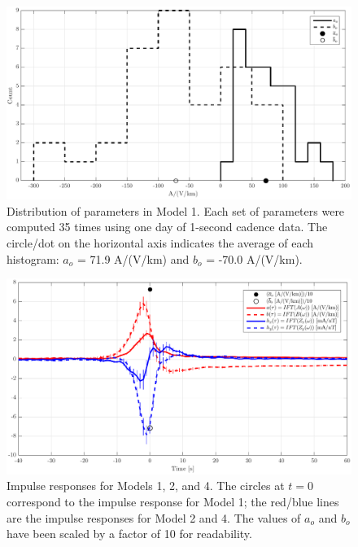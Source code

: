 \documentclass[draft,linenumbers]{agujournal2018}
\begin{document}
\begin{figure}[h]
\centering
\includegraphics[width=\textwidth]{figures/plot_model_summary_aobo_histograms-options-1.pdf}
\caption{Distribution of parameters in Model 1. Each set of parameters were computed 35 times using one day of 1-second cadence data. The circle/dot on the horizontal axis indicates the average of each histogram: $a_o$ = 71.9 A/(V/km) and $b_o$ = -70.0 A/(V/km).}
\label{histogram}
\end{figure}

\begin{figure}[h]
\centering
\includegraphics[width=\textwidth]{figures/plot_model_summary_H-options-1.pdf}
\caption{Impulse responses for Models 1, 2, and 4. The circles at $t = 0$ correspond to the impulse response for Model 1; the red/blue lines are the impulse responses for Model 2 and 4. The values of $a_o$ and $b_o$ have been scaled by a factor of 10 for readability.}
\label{H}
\end{figure}
\end{document}
